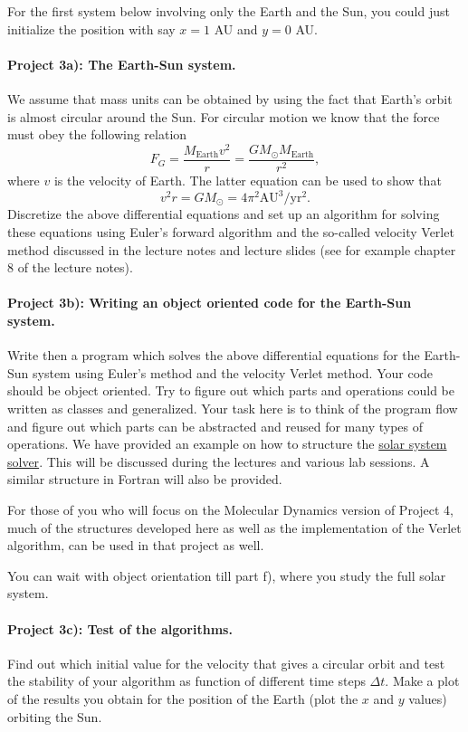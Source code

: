 \documentclass[%
oneside,                 %
final,                   %
10pt]{article}
\begin{document}
For the first system below involving only the Earth and the Sun, you could just initialize the position with say $x=1$ AU
and $y=0$ AU. 


\paragraph{Project 3a): The Earth-Sun system.}
We assume that mass units can be obtained by using the fact that Earth's orbit is almost circular around the Sun.
For circular motion we know that the force must obey the following relation
\[
F_G= \frac{M_{\mathrm{Earth}}v^2}{r}=\frac{GM_{\odot}M_{\mathrm{Earth}}}{r^2},
\]
where $v$ is the velocity of Earth. 
The latter equation can be used to show that
\[
v^2r=GM_{\odot}=4\pi^2\mathrm{AU}^3/\mathrm{yr}^2.
\]
Discretize the above differential equations and set up an algorithm for solving these equations using Euler's forward algorithm and the so-called velocity Verlet method discussed in the lecture notes and lecture slides (see for example chapter 8 of the lecture notes).

\paragraph{Project 3b): Writing an object oriented code for the Earth-Sun system.}
Write then a program which solves the above differential equations for the Earth-Sun system
using Euler's  method and the velocity Verlet method. 
Your code should be object oriented. Try to figure out which parts and operations could be written as classes
and generalized.  
Your task here is to think of the program flow and figure out which parts can be abstracted and reused for many types of operations. We have provided an example on how to structure
the \href{{https://github.com/CompPhysics/ComputationalPhysics/tree/master/doc/Programs/OOExamples}}{solar system solver}. This will be discussed during the lectures and various lab sessions. A similar structure in Fortran will also be provided. 

For those of you who will focus on the Molecular Dynamics version of Project 4, much of the structures developed here as well as the implementation of the Verlet algorithm, can be used in that project as well.

You can wait with object orientation till part f), where you study the full solar system. 

\paragraph{Project 3c): Test of the algorithms.}
Find out which initial value for the velocity that gives a circular orbit
and test the stability of your algorithm as function of different time steps $\Delta t$. 
Make a plot of the results you obtain for the position of the Earth (plot the $x$ and $y$ values) orbiting  the Sun.
\end{document}
